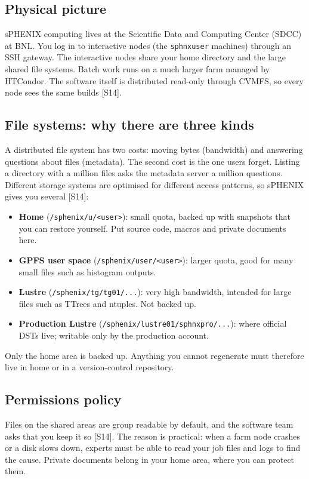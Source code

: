 \documentclass[11pt,letterpaper]{article}
\begin{document}
\subsection{Physical picture}
sPHENIX computing lives at the Scientific Data and Computing Center (SDCC) at BNL.
You log in to interactive nodes (the \texttt{sphnxuser} machines) through an SSH gateway.
The interactive nodes share your home directory and the large shared file systems.
Batch work runs on a much larger farm managed by HTCondor.
The software itself is distributed read-only through CVMFS, so every node sees the same builds [S14].

\subsection{File systems: why there are three kinds}
A distributed file system has two costs: moving bytes (bandwidth) and answering questions about files (metadata).
The second cost is the one users forget.
Listing a directory with a million files asks the metadata server a million questions.
Different storage systems are optimised for different access patterns, so sPHENIX gives you several [S14]:
\begin{itemize}
\item \textbf{Home} (\texttt{/sphenix/u/<user>}): small quota, backed up with snapshots that you can restore yourself. Put source code, macros and private documents here.
\item \textbf{GPFS user space} (\texttt{/sphenix/user/<user>}): larger quota, good for many small files such as histogram outputs.
\item \textbf{Lustre} (\texttt{/sphenix/tg/tg01/...}): very high bandwidth, intended for large files such as TTrees and ntuples. Not backed up.
\item \textbf{Production Lustre} (\texttt{/sphenix/lustre01/sphnxpro/...}): where official DSTs live; writable only by the production account.
\end{itemize}
Only the home area is backed up. Anything you cannot regenerate must therefore live in home or in a version-control repository.

\subsection{Permissions policy}
Files on the shared areas are group readable by default, and the software team asks that you keep it so [S14].
The reason is practical: when a farm node crashes or a disk slows down, experts must be able to read your job files and logs to find the cause.
Private documents belong in your home area, where you can protect them.
\end{document}
